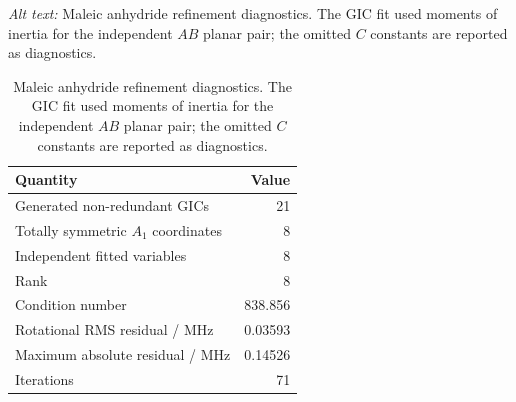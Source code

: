 \documentclass[12pt]{article}
\begin{document}
\FloatBarrier
\begin{table}
\caption{Maleic anhydride refinement diagnostics. The GIC fit used moments of
inertia for the independent $AB$ planar pair; the omitted $C$ constants are
reported as diagnostics.}
\label{tab:si-maleic-diagnostics}
\par\smallskip\noindent\textit{Alt text:} Maleic anhydride refinement diagnostics. The GIC fit used moments of inertia for the independent $AB$ planar pair; the omitted $C$ constants are reported as diagnostics.
\begin{tabular}{lr}
\toprule
Quantity & Value \\
\midrule
Generated non-redundant GICs & 21 \\
Totally symmetric $A_1$ coordinates & 8 \\
Independent fitted variables & 8 \\
Rank & 8 \\
Condition number & 838.856 \\
Rotational RMS residual / MHz & 0.03593 \\
Maximum absolute residual / MHz & 0.14526 \\
Iterations & 71 \\
\bottomrule
\end{tabular}
\end{table}
\end{document}
